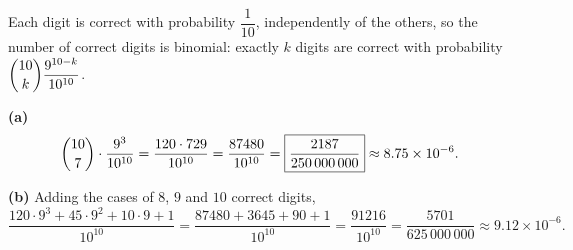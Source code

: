 Each digit is correct with probability $\dfrac{1}{10}$, independently of the others, so the number of correct digits is binomial: exactly $k$ digits are correct with probability $\dbinom{10}{k}\dfrac{9^{10-k}}{10^{10}}$.

\textbf{(a)}
\[\dbinom{10}{7}\cdot\dfrac{9^3}{10^{10}}=\dfrac{120\cdot729}{10^{10}}=\dfrac{87480}{10^{10}}=\boxed{\dfrac{2187}{250\,000\,000}}\approx8.75\times10^{-6}.\]

\textbf{(b)} Adding the cases of $8$, $9$ and $10$ correct digits,
\[\dfrac{120\cdot9^3+45\cdot9^2+10\cdot9+1}{10^{10}}=\dfrac{87480+3645+90+1}{10^{10}}=\dfrac{91216}{10^{10}}=\boxed{\dfrac{5701}{625\,000\,000}}\approx9.12\times10^{-6}.\]

